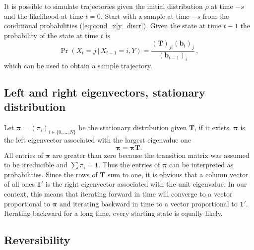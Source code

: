 \documentclass[preprint]{elsarticle}
\newcommand{\bs}[1]{\ensuremath{\boldsymbol{#1}}}
\newcommand\given{{\,|\,}}
\newcommand\x[1]{\ensuremath{X_{#1}}}
\newcommand\y{\ensuremath{Y}}
\newcommand\oneC{\ensuremath{\mathbf{1}'}}
\newcommand\oneR{\ensuremath{\mathbf{1}}}
\begin{document}

It is possible to simulate trajectories given the initial distribution $\rho$ at time $-s$ and the likelihood at time $t=0$. Start with a sample at time $-s$ from the conditional probabilities (\ref{eq:cond_x|y_discr}). Given the state at time $t-1$ the probability of the state at time $t$ is
\begin{equation}
    \Pr(\x{t}=j\given \x{t-1}=i,\y)=\frac{(\mathbf{T})_{ji}(\mathbf{b}_{t})_j}{(\mathbf{b}_{t-1})_i}\,,
\end{equation}
which can be used to obtain a sample trajectory. 

\subsection{Left and right eigenvectors, stationary distribution}

Let $\bs{\pi} = (\pi_i)_{i \in \{0,\ldots,N\}}$ be the stationary distribution given $\mathbf{T}$, if it exists. $\bs{\pi}$ is the left eigenvector associated with the largest eigenvalue one
\begin{equation}\label{eq:stationary}
\bs{\pi}=\bs{\pi}\mathbf{T}.
\end{equation}
All entries of $\bs{\pi}$ are greater than zero because the transition matrix was assumed to be irreducible and $\sum \pi_i = 1$. Thus the entries of $\bs{\pi}$ can be interpreted as probabilities. Since the rows of $\mathbf{T}$ sum to one, it is obvious that a column vector of all ones $\oneC$ is the right eigenvector associated with the unit eigenvalue. In our context, this means that iterating forward in time will converge to a vector proportional to $\bs{\pi}$ and iterating backward in time to a vector proportional to $\oneC$. %
Iterating backward for a long time, every starting state is equally likely. %

\subsection{Reversibility}
\end{document}
